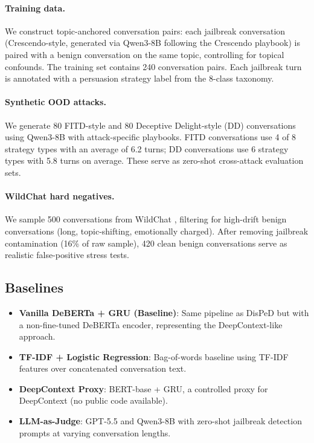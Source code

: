 \documentclass[11pt,a4paper]{article}
\newcommand{\ours}{DisPeD}
\begin{document}
\paragraph{Training data.}
We construct topic-anchored conversation pairs: each jailbreak conversation (Crescendo-style, generated via Qwen3-8B following the Crescendo playbook) is paired with a benign conversation on the same topic, controlling for topical confounds. The training set contains 240 conversation pairs. Each jailbreak turn is annotated with a persuasion strategy label from the 8-class taxonomy.

\paragraph{Synthetic OOD attacks.}
We generate 80 FITD-style and 80 Deceptive Delight-style (DD) conversations using Qwen3-8B with attack-specific playbooks. FITD conversations use 4 of 8 strategy types with an average of 6.2 turns; DD conversations use 6 strategy types with 5.8 turns on average. These serve as zero-shot cross-attack evaluation sets.

\paragraph{WildChat hard negatives.}
We sample 500 conversations from WildChat \cite{zhao2024wildchat}, filtering for high-drift benign conversations (long, topic-shifting, emotionally charged). After removing jailbreak contamination (16\% of raw sample), 420 clean benign conversations serve as realistic false-positive stress tests.

\subsection{Baselines}

\begin{itemize}
\item \textbf{Vanilla DeBERTa + GRU (Baseline)}: Same pipeline as \ours{} but with a non-fine-tuned DeBERTa encoder, representing the DeepContext-like approach.
\item \textbf{TF-IDF + Logistic Regression}: Bag-of-words baseline using TF-IDF features over concatenated conversation text.
\item \textbf{DeepContext Proxy}: BERT-base + GRU, a controlled proxy for DeepContext (no public code available).
\item \textbf{LLM-as-Judge}: GPT-5.5 and Qwen3-8B with zero-shot jailbreak detection prompts at varying conversation lengths.
\end{itemize}
\end{document}
